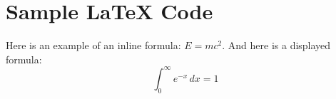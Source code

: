 \documentclass{article}
\begin{document}
\section*{Sample LaTeX Code}
Here is an example of an inline formula: \( E = mc^2 \).
And here is a displayed formula:
\[
\int_{0}^{\infty} e^{-x} \, dx = 1
\]
\end{document}
